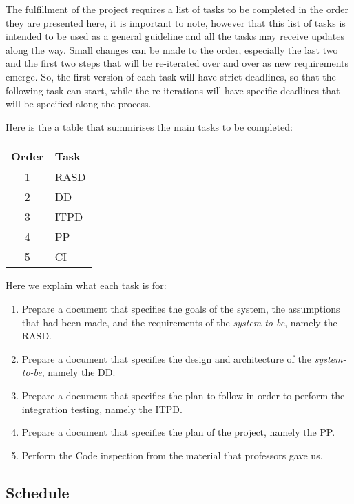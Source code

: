 The fulfillment of the project requires a list of tasks to be completed in the order they are presented here, it is important to note, however that this list of tasks is intended to be used as a general guideline and all the tasks may receive updates along the way.
Small changes can be made to the order, especially the last two and the first two steps that will be re-iterated over and over as new requirements emerge.
So, the first version of each task will have strict deadlines, so that the following task can start, while the re-iterations will have specific deadlines that will be specified along the process.

Here is the a table that summirises the main tasks to be completed:
\begin{center}
\begin{tabular}{ |c|l| } \hline
	\textbf{Order} & \textbf{Task} \\ \hline
	1 & RASD \\ \hline
	2 & DD \\ \hline
	3 & ITPD \\ \hline
	4 & PP \\ \hline
	5 & CI \\ \hline
\end{tabular}
\end{center}

Here we explain what each task is for:

\begin{enumerate}
	\item Prepare a document that specifies the goals of the system, the assumptions that had been made, and the requirements of the \emph{system-to-be}, namely the RASD.
	\item Prepare a document that specifies the design and architecture of the \emph{system-to-be}, namely the DD.
	\item Prepare a document that specifies the plan to follow in order to perform the integration testing, namely the ITPD.
	\item Prepare a document that specifies the plan of the project, namely the PP.
	\item Perform the Code inspection from the material that professors gave us.
\end{enumerate}

\subsection{Schedule} %
\label{sub:schedule}

